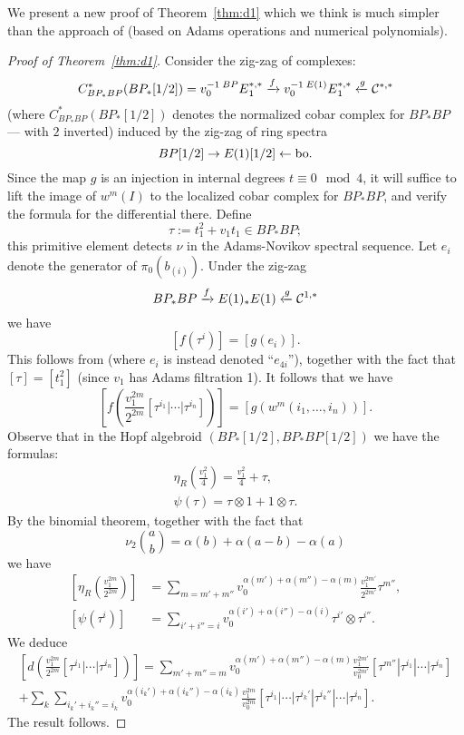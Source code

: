 We present a new proof of Theorem~\ref{thm:d1} which we think is much simpler than the approach of \cite{LM} (based on Adams operations and numerical polynomials).

\begin{proof}[Proof of Theorem~\ref{thm:d1}]
Consider the zig-zag of complexes:
$$ C^*_{BP_*BP}(BP_*[1/2]) = v_0^{-1}\prescript{BP}{}{E}^{*,*}_1 \xrightarrow{f} v_0^{-1} \prescript{E(1)}{}{E}^{*,*}_1 \xleftarrow{g} \mathcal{C}^{*,*} $$
(where $C^*_{BP_*BP}(BP_*[1/2])$ denotes the normalized cobar complex for $BP_*BP$ --- with $2$ inverted) induced by the zig-zag of ring spectra
$$ BP [1/2] \rightarrow E(1)[1/2] \leftarrow \mathrm{bo}. $$
Since the map $g$ is an injection in internal degrees $t \equiv 0 \mod 4$, it will suffice to lift the image of $w^m(I)$ to the localized cobar complex for $BP_*BP$, and verify the formula for the differential there. 
Define
$$ \tau := t_1^2 + v_1t_1 \in BP_*BP; $$
this primitive element detects $\nu$ in the Adams-Novikov spectral sequence.
Let $e_i$ denote the generator of $\pi_0(b_{(i)})$.  Under the zig-zag
$$ BP_*BP \xrightarrow{f} E(1)_*E(1) \xleftarrow{g} \mathcal{C}^{1,*} $$
we have
$$ [f(\tau^i)] = [g(e_i)]. $$
This follows from \cite[Sec.~3.4]{BOSS} (where $e_i$ is instead denoted ``$e_{4i}$''), together with the fact that $[\tau] = [t_1^2]$ (since $v_1$ has Adams filtration 1).
It follows that we have  
$$ \left[f\left(\frac{v_1^{2m}}{2^{2m}} [\tau^{i_1}| \cdots | \tau^{i_n}]\right)\right]
= [g(w^m(i_1, \ldots, i_n))]. $$
Observe that in the Hopf algebroid $(BP_*[1/2], BP_*BP[1/2])$ we have the formulas:
\begin{align*}
\eta_R\left(\frac{v_1^2}{4}\right) = \frac{v_1^2}{4} + \tau, \\
\psi(\tau) = \tau \otimes 1 + 1 \otimes \tau.
\end{align*}
By the binomial theorem, together with the fact that
$$ \nu_2 \binom{a}{b} = \alpha(b)+\alpha(a-b)-\alpha(a) $$
we have
\begin{align*}
\left[\eta_R\left(\frac{v_1^{2m}}{2^{2m}}\right)\right] &= \sum_{m = m' + m''}v_0^{\alpha(m')+\alpha(m'') - \alpha(m)}\frac{v_1^{2m'}}{2^{2m'}}\tau^{m''}, \\
[\psi(\tau^i)] &= \sum_{i'+i'' = i} v_0^{\alpha(i')+\alpha(i'') - \alpha(i)}\tau^{i'} \otimes \tau^{i''}.
\end{align*}
We deduce 
\begin{multline*}
	 \left[d\left(\frac{v_1^{2m}}{2^{2m}} [\tau^{i_1}| \cdots | \tau^{i_n}] \right)\right] = \sum_{m' + m'' = m} v_0^{\alpha(m')+\alpha(m'')-\alpha(m)} \frac{v_1^{2m'}}{v_0^{2m'}} [\tau^{m''}| \tau^{i_1}| \cdots | \tau^{i_n}] \\ + 
	\sum_k \sum_{i_k'+i_k'' = i_k} v_0^{\alpha(i_k') + \alpha(i_k'')-\alpha(i_k)} \frac{v_1^{2m}}{v_0^{2m}}[\tau^{i_1}|\cdots|\tau^{i_k'}|\tau^{i_k''}| \cdots |\tau^{i_n}]. \end{multline*}
The result follows.
\end{proof}
















 